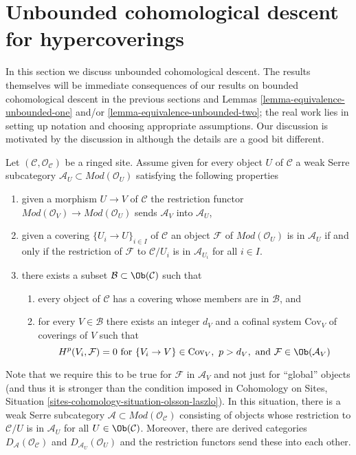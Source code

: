 \section{Unbounded cohomological descent for hypercoverings}
\label{section-unbounded-cohomological-descent}

\noindent
In this section we discuss unbounded cohomological descent.
The results themselves will be immediate consequences of
our results on bounded cohomological descent in the previous
sections and Lemmas \ref{lemma-equivalence-unbounded-one} and/or
\ref{lemma-equivalence-unbounded-two}; the real work lies
in setting up notation and choosing appropriate assumptions.
Our discussion is motivated by the discussion in \cite{six-I}
although the details are a good bit different.

\medskip\noindent
Let $(\mathcal{C}, \mathcal{O}_\mathcal{C})$ be a ringed site.
Assume given for every object $U$ of $\mathcal{C}$
a weak Serre subcategory $\mathcal{A}_U \subset \textit{Mod}(\mathcal{O}_U)$
satisfying the following properties
\begin{enumerate}
\item
\label{item-restriction}
given a morphism $U \to V$ of $\mathcal{C}$ the restriction
functor $\textit{Mod}(\mathcal{O}_V) \to \textit{Mod}(\mathcal{O}_U)$
sends $\mathcal{A}_V$ into $\mathcal{A}_U$,
\item
\label{item-local}
given a covering $\{U_i \to U\}_{i \in I}$ of $\mathcal{C}$
an object $\mathcal{F}$ of $\textit{Mod}(\mathcal{O}_U)$
is in $\mathcal{A}_U$ if and only if the restriction of
$\mathcal{F}$ to $\mathcal{C}/U_i$ is in $\mathcal{A}_{U_i}$
for all $i \in I$.
\item
\label{item-bounded-dimension}
there exists a subset $\mathcal{B} \subset \Ob(\mathcal{C})$
such that
\begin{enumerate}
\item every object of $\mathcal{C}$ has a covering whose
members are in $\mathcal{B}$, and
\item for every $V \in \mathcal{B}$ there exists an integer $d_V$
and a cofinal system $\text{Cov}_V$ of coverings of $V$ such
that
$$
H^p(V_i, \mathcal{F}) = 0 \text{ for }
\{V_i \to V\} \in \text{Cov}_V,\ p > d_V, \text{ and }
\mathcal{F} \in \Ob(\mathcal{A}_V)
$$
\end{enumerate}
\end{enumerate}
Note that we require this to be true for $\mathcal{F}$ in
$\mathcal{A}_V$ and not just for ``global'' objects
(and thus it is stronger than the condition imposed in
Cohomology on Sites, Situation \ref{sites-cohomology-situation-olsson-laszlo}).
In this situation, there is a weak Serre subcategory
$\mathcal{A} \subset \textit{Mod}(\mathcal{O}_\mathcal{C})$
consisting of objects whose restriction to $\mathcal{C}/U$
is in $\mathcal{A}_U$ for all $U \in \Ob(\mathcal{C})$.
Moreover, there are derived categories
$D_\mathcal{A}(\mathcal{O}_\mathcal{C})$ and
$D_{\mathcal{A}_U}(\mathcal{O}_U)$ and the restriction
functors send these into each other.

